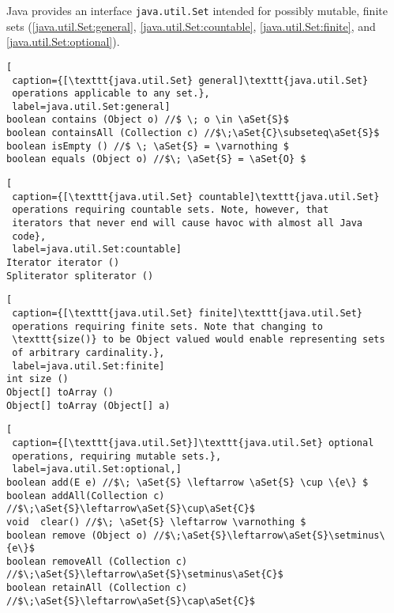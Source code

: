 Java provides an interface \lstinline|java.util.Set| intended for
possibly mutable, finite sets (\autoref{java.util.Set:general},
 \autoref{java.util.Set:countable}, 
 \autoref{java.util.Set:finite}, 
 and
\autoref{java.util.Set:optional}).

\begin{lstlisting}[
 caption={[\texttt{java.util.Set} general]\texttt{java.util.Set} 
 operations applicable to any set.}, 
 label=java.util.Set:general]
boolean contains (Object o) //$ \; o \in \aSet{S}$
boolean containsAll (Collection c) //$\;\aSet{C}\subseteq\aSet{S}$ 
boolean isEmpty () //$ \; \aSet{S} = \varnothing $
boolean equals (Object o) //$\; \aSet{S} = \aSet{O} $
\end{lstlisting}
\begin{lstlisting}[
 caption={[\texttt{java.util.Set} countable]\texttt{java.util.Set} 
 operations requiring countable sets. Note, however, that 
 iterators that never end will cause havoc with almost all Java
 code}, 
 label=java.util.Set:countable]
Iterator iterator ()
Spliterator spliterator ()
\end{lstlisting}
\begin{lstlisting}[
 caption={[\texttt{java.util.Set} finite]\texttt{java.util.Set} 
 operations requiring finite sets. Note that changing to
 \texttt{size()} to be Object valued would enable representing sets
 of arbitrary cardinality.}, 
 label=java.util.Set:finite] 
int size () 
Object[] toArray ()
Object[] toArray (Object[] a)
\end{lstlisting}
\begin{lstlisting}[
 caption={[\texttt{java.util.Set}]\texttt{java.util.Set} optional
 operations, requiring mutable sets.}, 
 label=java.util.Set:optional,]
boolean add(E e) //$\; \aSet{S} \leftarrow \aSet{S} \cup \{e\} $
boolean addAll(Collection c) //$\;\aSet{S}\leftarrow\aSet{S}\cup\aSet{C}$ 
void  clear() //$\; \aSet{S} \leftarrow \varnothing $ 
boolean remove (Object o) //$\;\aSet{S}\leftarrow\aSet{S}\setminus\{e\}$
boolean removeAll (Collection c) //$\;\aSet{S}\leftarrow\aSet{S}\setminus\aSet{C}$ 
boolean retainAll (Collection c) //$\;\aSet{S}\leftarrow\aSet{S}\cap\aSet{C}$
\end{lstlisting}

